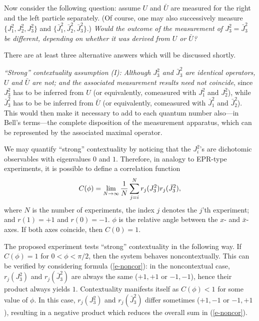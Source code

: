 Now consider the following question: assume $U$
and
$\bar U$ are measured for the right and the left particle separately.
(Of course, one may also successively measure
$\{
J_1^2,
J_2^2,
J_3^2\}$
and
$\{
\bar{J}_1^2,
\bar{J}_2^2,
\bar{J}_3^2\}$.)
{\em Would the outcome of the measurement of $J_3^2=\bar J_3^2$ be
different, depending on whether it was derived from $U$ or $\bar U$?}

There are at least three alternative answers which will be discussed
shortly.

{\em ``Strong'' contextuality assumption (I):
Although
$J_3^2$ and
$\bar J^2_3$ are identical operators,  $U$ and $\bar U$ are not;
and
the associated measurement results need {\em not} coincide}, since
$J_3^2$ has to be inferred from $U$ (or equivalently, comeasured with
$J_1^2$  and
$J_2^2$),
while
$\bar J_3^2$
has to be be inferred from $\bar U$ (or equivalently, comeasured with
$\bar J_1^2$ and
$\bar J_2^2$). This would then make it necessary to add to each quantum
number also---in Bell's terms---the complete disposition of the
measurement apparatus, which can be represented by the associated
maximal operator.
%


We may quantify ``strong'' contextuality by
noticing  that the $J^2_i$'s are dichotomic observables with
eigenvalues $0$ and $1$. Therefore, in analogy to EPR-type experiments,
it is possible to define a correlation function
\begin{equation}
C(\phi )=\lim_{N\rightarrow \infty}{1\over N}\sum_{j=i}^N
r_j(J_3^2)r_j(\bar J_3^2),
\label{e-noncor}
\end{equation}
where $N$ is the number of experiments, the index $j$ denotes the $j$'th
experiment; and $r(1)=+1$ and $r(0)=-1$. $\phi $ is the relative
angle between the $x$- and $\bar x$-axes. If both axes coincide, then
$C(0)=1$.

The proposed experiment tests ``strong'' contextuality in the following way. If
$C(
\phi
)=1$ for
$0< \phi <\pi /2$, then the system behaves noncontextually.
This can be  verified by considering formula
(\ref{e-noncor}): in the noncontextual case,
$r_j(J_3^2)$ and $r_j(\bar J_3^2)$ are always the same ($+1,+1$ or $-1,-1$),
hence their product always yields $1$.
Contextuality manifests itself as $C(\phi)<1$ for some value of
$\phi$.
In this case,
$r_j(J_3^2)$ and $r_j(\bar J_3^2)$ differ sometimes ($+1,-1$ or $-1,+1$),
resulting in a negative product which reduces the overall sum in
(\ref{e-noncor}).

